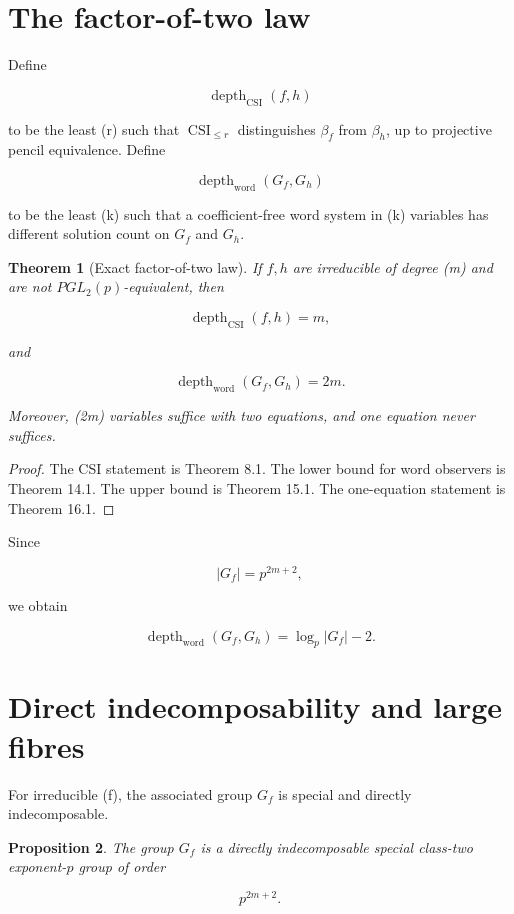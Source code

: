 \documentclass[11pt]{article}
\newtheorem{theorem}{Theorem}[section]
\newtheorem{proposition}[theorem]{Proposition}
\begin{document}
\section{The factor-of-two law}

Define

\[
\operatorname{depth}_{\mathrm{CSI}}(f,h)
\]

to be the least (r) such that $\operatorname{CSI}_{\le r}$ distinguishes $\beta_f$ from $\beta_h$, up to projective pencil equivalence. Define

\[
\operatorname{depth}_{\mathrm{word}}(G_f,G_h)
\]

to be the least (k) such that a coefficient-free word system in (k) variables has different solution count on $G_f$ and $G_h$.

\begin{theorem}[Exact factor-of-two law]
If $f,h$ are irreducible of degree (m) and are not $PGL_2(p)$-equivalent, then

\[
\boxed{
\operatorname{depth}_{\mathrm{CSI}}(f,h)=m,
}
\]

and

\[
\boxed{
\operatorname{depth}_{\mathrm{word}}(G_f,G_h)=2m.
}
\]

Moreover, (2m) variables suffice with two equations, and one equation never suffices.

\end{theorem}

\begin{proof}
The CSI statement is Theorem 8.1. The lower bound for word observers is Theorem 14.1. The upper bound is Theorem 15.1. The one-equation statement is Theorem 16.1.

\end{proof}

Since

\[
|G_f|=p^{2m+2},
\]

we obtain

\[
\boxed{
\operatorname{depth}_{\mathrm{word}}(G_f,G_h)
=\log_p|G_f|-2.
}
\tag{17.1}
\]

\section{Direct indecomposability and large fibres}

For irreducible (f), the associated group $G_f$ is special and directly indecomposable.

\begin{proposition}
The group $G_f$ is a directly indecomposable special class-two exponent-$p$ group of order

\[
p^{2m+2}.
\]

\end{proposition}
\end{document}
